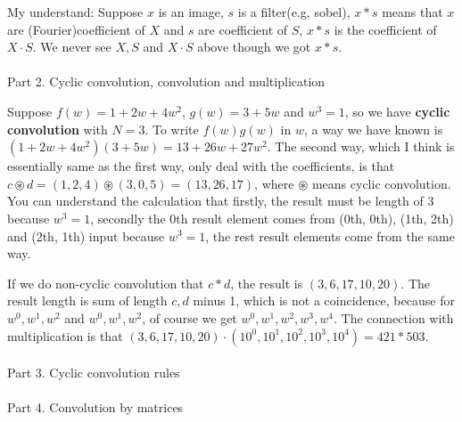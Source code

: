 \documentclass{article}
\begin{document}
\begin{spacing}{1.5}
My understand: Suppose $x$ is an image, $s$ is a filter(e.g, sobel), $x*s$ means that $x$ are (Fourier)coefficient of $X$ and $s$ are coefficient of $S$, $x*s$ is the coefficient of $X\cdot S$. We never see $X, S$ and $X\cdot S$ above though we got $x*s$.
\\\\ Part 2. Cyclic convolution, convolution and multiplication 

Suppose $f(w)=1+2w+4w^2$, $g(w)=3+5w$ and $w^3=1$, so we have {\bfseries cyclic convolution} with $N=3$. To write $f(w)g(w)$ in $w$, a way we have known is $(1+2w+4w^2)(3+5w)=13+ 26w+27w^2$. The second way, which I think is essentially same as the first way, only deal with the coefficients, is that $c \circledast d = (1, 2, 4) \circledast (3, 0 ,5) = (13, 26, 17)$, where $\circledast$ means cyclic convolution. You can understand the calculation that firstly, the result must be length of 3 because $w^3=1$, secondly the 0th result element comes from (0th, 0th), (1th, 2th) and (2th, 1th) input because $w^3=1$, the rest result elements come from the same way. 

If we do non-cyclic convolution that $c*d$, the result is $(3, 6, 17, 10, 20)$. The  result length is sum of length $c, d$ minus 1, which is not a coincidence, because for $w^0, w^1, w^2$ and $w^0, w^1, w^2$, of course we get $w^0, w^1, w^2, w^3, w^4$. The connection with multiplication is that $(3, 6, 17, 10, 20) \cdot (10^0, 10^1, 10^2, 10^3, 10^4)=421*503$.
\\\\ Part 3. Cyclic convolution rules
\\\\ Part 4. Convolution by matrices 


\end{spacing}
\end{document}
